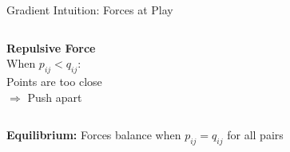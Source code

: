 \documentclass{beamer}
\begin{document}
\begin{frame}{Gradient Intuition: Forces at Play}
\begin{columns}[T]
\begin{column}{0.48\textwidth}
\begin{center}
\colorbox{orange!10}{
\begin{minipage}{0.9\columnwidth}
\centering
\textbf{Repulsive Force}\\
\footnotesize
When $p_{ij} < q_{ij}$:\\
Points are too close\\
$\Rightarrow$ Push apart
\end{minipage}
}
\end{center}
\end{column}
\end{columns}

\vspace{0.3cm}
\begin{center}
\colorbox{upcblue!10}{
\begin{minipage}{0.85\textwidth}
\centering
\footnotesize\textbf{Equilibrium:} Forces balance when $p_{ij} = q_{ij}$ for all pairs
\end{minipage}
}
\end{center}
\end{frame}
\end{document}
